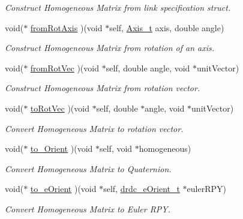 \begin{CompactItemize}
\begin{CompactList}\small\item\em Construct Homogeneous Matrix from link specification struct. \item\end{CompactList}\item 
void($\ast$ \hyperlink{structdrdc__HMatrix__t_db74c31930baca46044d5881184e0ee1}{fromRotAxis} )(void $\ast$self, \hyperlink{libdrdc_8h_32b2eaf8bafc891ec8018cbe48d39243}{Axis\_\-t} axis, double angle)
\begin{CompactList}\small\item\em Construct Homogeneous Matrix from rotation of an axis. \item\end{CompactList}\item 
void($\ast$ \hyperlink{structdrdc__HMatrix__t_9a588ae7f69e12776056643b2e4477aa}{fromRotVec} )(void $\ast$self, double angle, void $\ast$unitVector)
\begin{CompactList}\small\item\em Construct Homogeneous Matrix from rotation vector. \item\end{CompactList}\item 
void($\ast$ \hyperlink{structdrdc__HMatrix__t_f6d72ccdd0cb8fae5bd0331abb616dc6}{toRotVec} )(void $\ast$self, double $\ast$angle, void $\ast$unitVector)
\begin{CompactList}\small\item\em Convert Homogeneous Matrix to rotation vector. \item\end{CompactList}\item 
void($\ast$ \hyperlink{structdrdc__HMatrix__t_0b7448261d2d879f92800461aed4e09e}{to\_\-Orient} )(void $\ast$self, void $\ast$homogeneous)
\begin{CompactList}\small\item\em Convert Homogeneous Matrix to Quaternion. \item\end{CompactList}\item 
void($\ast$ \hyperlink{structdrdc__HMatrix__t_8c9ab96f1d2099138e7f9bace51c9fb1}{to\_\-eOrient} )(void $\ast$self, \hyperlink{structdrdc__eOrient__t}{drdc\_\-eOrient\_\-t} $\ast$eulerRPY)
\begin{CompactList}\small\item\em Convert Homogeneous Matrix to Euler RPY. \item\end{CompactList}\item 

\end{CompactItemize}
